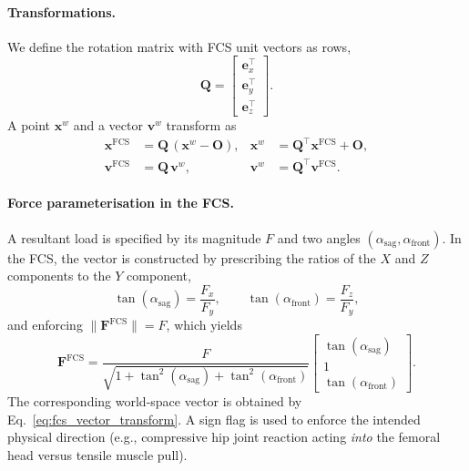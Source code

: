 \paragraph{Transformations.}
We define the rotation matrix with FCS unit vectors as rows,
\begin{equation}
\mathbf{Q}=\begin{bmatrix}\mathbf{e}_x^{\top}\\ \mathbf{e}_y^{\top}\\ \mathbf{e}_z^{\top}\end{bmatrix}.
\end{equation}
A point $\mathbf{x}^w$ and a vector $\mathbf{v}^w$ transform as
\begin{align}
\mathbf{x}^{\mathrm{FCS}} &= \mathbf{Q}\,(\mathbf{x}^w-\mathbf{O}), &
\mathbf{x}^w &= \mathbf{Q}^{\top}\mathbf{x}^{\mathrm{FCS}}+\mathbf{O}, \label{eq:fcs_point_transform}\\
\mathbf{v}^{\mathrm{FCS}} &= \mathbf{Q}\,\mathbf{v}^w, &
\mathbf{v}^w &= \mathbf{Q}^{\top}\mathbf{v}^{\mathrm{FCS}}. \label{eq:fcs_vector_transform}
\end{align}

\paragraph{Force parameterisation in the FCS.}
A resultant load is specified by its magnitude $F$ and two angles $(\alpha_{\mathrm{sag}},\alpha_{\mathrm{front}})$. In the FCS, the vector is constructed by prescribing the ratios of the $X$ and $Z$ components to the $Y$ component,
\begin{equation}
\tan(\alpha_{\mathrm{sag}})=\frac{F_x}{F_y},
\qquad
\tan(\alpha_{\mathrm{front}})=\frac{F_z}{F_y},
\end{equation}
and enforcing $\lVert\mathbf{F}^{\mathrm{FCS}}\rVert=F$, which yields
\begin{equation}
\mathbf{F}^{\mathrm{FCS}}=
\frac{F}{\sqrt{1+\tan^2(\alpha_{\mathrm{sag}})+\tan^2(\alpha_{\mathrm{front}})}}
\begin{bmatrix}
\tan(\alpha_{\mathrm{sag}})\\[2pt]
1\\[2pt]
\tan(\alpha_{\mathrm{front}})
\end{bmatrix}.
\label{eq:force_from_angles}
\end{equation}
The corresponding world-space vector is obtained by Eq.~\eqref{eq:fcs_vector_transform}. A sign flag is used to enforce the intended physical direction (e.g., compressive hip joint reaction acting \emph{into} the femoral head versus tensile muscle pull).

